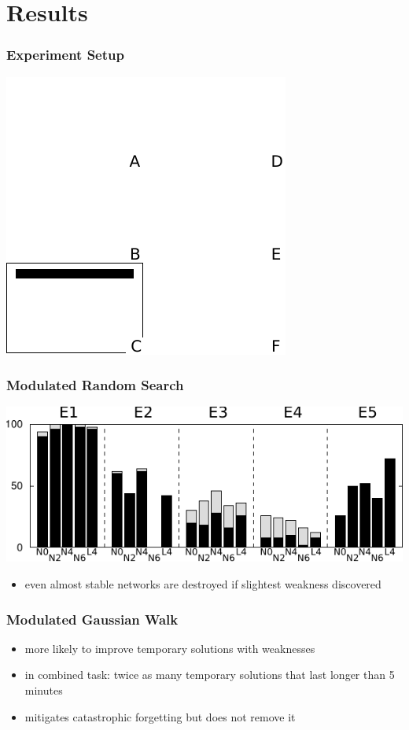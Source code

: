 \documentclass[14pt]{beamer}
\theoremstyle{remark}
\begin{document}
\section{Results}

\begin{frame}[t]
    \frametitle{Experiment Setup}
    \centering
    \includegraphics{experiments-drawing}
\end{frame}

\begin{frame}[t]
    \frametitle{Modulated Random Search}
    \centering
    \includegraphics{mrs-results}
    \begin{itemize}
        \item even almost stable networks are destroyed if slightest weakness
              discovered
	\end{itemize}
\end{frame}

\begin{frame}[t]
    \frametitle{Modulated Gaussian Walk}
    \begin{itemize}
        \item more likely to improve temporary solutions with weaknesses
        \vfill
        \item in combined task: twice as many temporary solutions that last longer
              than 5 minutes
        \vfill
        \item mitigates catastrophic forgetting but does not remove it
	\end{itemize}
\end{frame}
\end{document}

